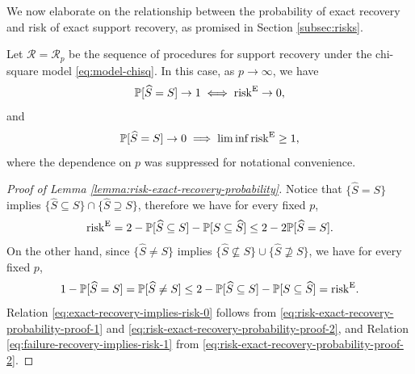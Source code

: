 We now elaborate on the relationship between the probability of exact recovery and risk of exact support recovery, as promised in Section \ref{subsec:risks}.
\begin{lemma} \label{lemma:risk-exact-recovery-probability}
Let $\mathcal{R} = \mathcal{R}_p$ be the sequence of procedures for support recovery under the chi-square model \eqref{eq:model-chisq}. 
In this case, as $p\to\infty$, we have
\begin{equation} \label{eq:exact-recovery-implies-risk-0}
    \P[\widehat{S} = S] \to 1 \iff \mathrm{risk}^{\mathrm{E}}\to0,
\end{equation}
and
\begin{equation} \label{eq:failure-recovery-implies-risk-1}
    \P[\widehat{S} = S] \to 0 \implies \liminf\mathrm{risk}^{\mathrm{E}}\ge1,
\end{equation}
where the dependence on $p$ was suppressed for notational convenience.
\end{lemma}

\begin{proof}[Proof of Lemma \ref{lemma:risk-exact-recovery-probability}]
Notice that $\{\widehat{S}=S\}$ implies $\{\widehat{S}\subseteq S\} \cap \{\widehat{S}\supseteq S\}$, therefore we have for every fixed $p$,
\begin{equation} \label{eq:risk-exact-recovery-probability-proof-1}
    \mathrm{risk}^{\mathrm{E}} 
    = 2 - \P[\widehat{S} \subseteq S] - \P[S \subseteq \widehat{S}] \\
    \le 2 - 2\P[\widehat{S}=S].
\end{equation}
On the other hand, since $\{\widehat{S}\neq S\}$ implies $\{\widehat{S}\not\subseteq S\} \cup \{\widehat{S}\not\supseteq S\}$, we have for every fixed $p$,
\begin{equation} \label{eq:risk-exact-recovery-probability-proof-2}
    1 - \P[\widehat{S}=S]
    = \P[\widehat{S}\neq S]
    \le 2 - \P[\widehat{S} \subseteq S] - \P[S \subseteq \widehat{S}]
    = \mathrm{risk}^{\mathrm{E}}. 
\end{equation}
Relation \eqref{eq:exact-recovery-implies-risk-0} follows from \eqref{eq:risk-exact-recovery-probability-proof-1} and \eqref{eq:risk-exact-recovery-probability-proof-2}, and Relation \eqref{eq:failure-recovery-implies-risk-1} from \eqref{eq:risk-exact-recovery-probability-proof-2}.
\end{proof}

